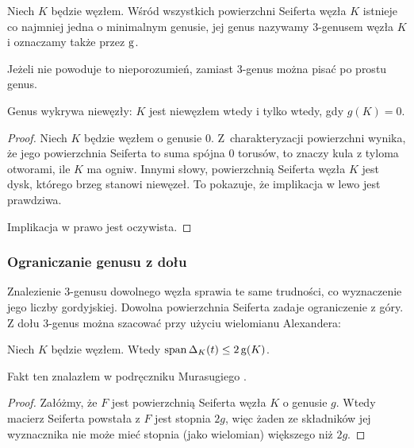 \begin{definition}[3-genus]
    Niech $K$ będzie węzłem.
    Wśród wszystkich powierzchni Seiferta węzła $K$ istnieje co najmniej jedna o minimalnym genusie, jej genus nazywamy 3-genusem węzła $K$ i oznaczamy także przez $\operatorname{g}$.
\end{definition}

Jeżeli nie powoduje to nieporozumień, zamiast 3-genus można pisać po prostu genus.

\begin{proposition}
    \label{prp:genus_detects_unknot}
    Genus wykrywa niewęzły: $K$ jest niewęzłem wtedy i tylko wtedy, gdy $g(K) = 0$.
\end{proposition}

\begin{proof}
    Niech $K$ będzie węzłem o genusie $0$.
    Z~charakteryzacji powierzchni wynika, że jego powierzchnia Seiferta to suma spójna $0$ torusów, to znaczy kula z tyloma otworami, ile $K$ ma ogniw.
    Innymi słowy, powierzchnią Seiferta węzła $K$ jest dysk, którego brzeg stanowi niewęzeł.
    To pokazuje, że implikacja w lewo jest prawdziwa.

    Implikacja w prawo jest oczywista.
\end{proof}

\subsubsection{Ograniczanie genusu z dołu}
Znalezienie 3-genusu dowolnego węzła sprawia te same trudności, co wyznaczenie jego liczby gordyjskiej.
Dowolna powierzchnia Seiferta zadaje ograniczenie z góry.
Z dołu 3-genus można szacować przy użyciu wielomianu Alexandera:
%

\begin{proposition}
    \label{prp:alexander_genus}
    Niech $K$ będzie węzłem.
    Wtedy $\operatorname{span} \Delta_K(t) \le 2\operatorname{g}(K)$.
\end{proposition}

Fakt ten znalazłem w podręczniku Murasugiego \cite[s. 131]{murasugi96}.

\begin{proof}
    Załóżmy, że $F$ jest powierzchnią Seiferta węzła $K$ o genusie $g$.
    Wtedy macierz Seiferta powstała z $F$ jest stopnia $2g$, więc żaden ze składników jej wyznacznika nie może mieć stopnia (jako wielomian) większego niż $2g$.
\end{proof}

